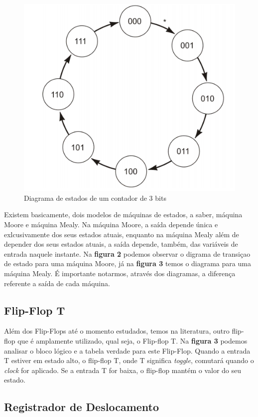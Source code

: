 \documentclass[12pt]{article}
\begin{document}
\begin{figure}[!htbp]
\centering
\includegraphics[width=.5\textwidth]{img/diagrama-estados.png}
\caption{Diagrama de estados de um contador de 3 bits\cite{floyd2011digital}}
\label{fig:diagrama-estados}
\end{figure}

Existem basicamente, dois modelos de máquinas de estados, a saber, máquina Moore e máquina Mealy. Na máquina Moore, a saída depende única e exlcusivamente dos seus estados atuais, enquanto na máquina Mealy além de depender dos seus estados atuais, a saída depende, também, das variáveis de entrada naquele instante. Na \textbf{figura 2} podemos observar  o digrama de transiçao de estado para uma máquina Moore, já na \textbf{figura 3} temos o diagrama para uma máquina Mealy. É importante notarmos, através dos diagramas, a diferença referente a saída de cada máquina.    


\subsection{Flip-Flop T}

Além dos Flip-Flops até o momento estudados, temos na literatura, outro flip-flop que é amplamente utilizado, qual seja, o Flip-flop T. Na \textbf{figura 3} podemos analisar o bloco lógico e a tabela verdade para este Flip-Flop. Quando a entrada T estiver em estado alto, o flip-flop T, onde T significa \textit{toggle}, comutará quando o \textit{clock} for aplicado. Se a entrada T for baixa, o flip-flop mantém o valor do seu estado.


\subsection{Registrador de Deslocamento}
\end{document}
